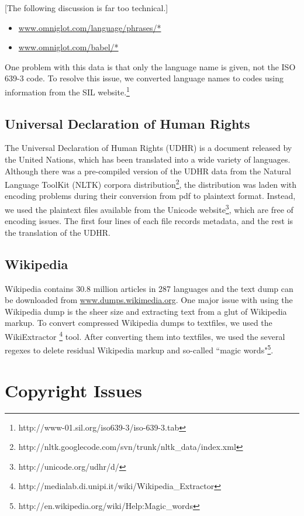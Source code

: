 \documentclass[11pt]{article}
\begin{document}
[The following discussion is far too technical.]

\begin{itemize}[noitemsep]
\item \url{www.omniglot.com/language/phrases/*} 
\item \url{www.omniglot.com/babel/*}
\end{itemize}

\noindent One problem with this data is that only the language name is given, not the ISO 639-3 code. To resolve this issue, we converted language names to codes using information from the SIL website.\footnote{http://www-01.sil.org/iso639-3/iso-639-3.tab}

\subsection{Universal Declaration of Human Rights}

The Universal Declaration of Human Rights (UDHR) is a document released by the United Nations, which has been translated into a wide variety of languages. Although there was a pre-compiled version of the UDHR data from the Natural Language ToolKit (NLTK) corpora distribution\footnote{http://nltk.googlecode.com/svn/trunk/nltk\_data/index.xml}, the distribution was laden with encoding problems during their conversion from pdf to plaintext format. Instead, we used the plaintext files available from the Unicode website\footnote{http://unicode.org/udhr/d/}, which are free of encoding issues. The first four lines of each file records metadata, and the rest is the translation of the UDHR.

\subsection{Wikipedia}

Wikipedia contains 30.8 million articles in 287 languages and the text dump can be downloaded from \url{www.dumps.wikimedia.org}. \noindent One major issue with using the Wikipedia dump is the sheer size and extracting text from a glut of Wikipedia markup. To convert compressed Wikipedia dumps to textfiles, we used the WikiExtractor \footnote{http://medialab.di.unipi.it/wiki/Wikipedia\_Extractor} tool. After converting them into textfiles, we used the several regexes to delete residual Wikipedia markup and so-called ``magic words"\footnote{http://en.wikipedia.org/wiki/Help:Magic\_words}.

\section{Copyright Issues}
\end{document}
